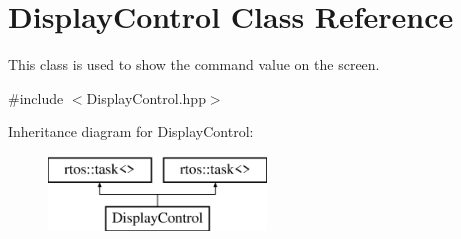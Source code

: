 \hypertarget{class_display_control}{}\section{Display\+Control Class Reference}
\label{class_display_control}


This class is used to show the command value on the screen.  




{\ttfamily \#include $<$Display\+Control.\+hpp$>$}

Inheritance diagram for Display\+Control\+:\begin{figure}[H]
\begin{center}
\leavevmode
\includegraphics[height=2.000000cm]{class_display_control}
\end{center}
\end{figure}

